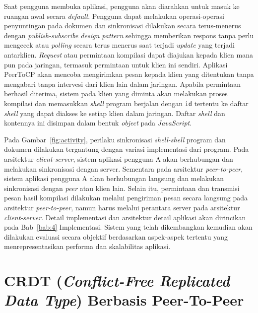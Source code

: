 Saat pengguna membuka aplikasi, pengguna akan diarahkan untuk masuk ke ruangan awal secara \textit{default}. Pengguna dapat melakukan operasi-operasi penyuntingan pada dokumen dan sinkronisasi dilakukan secara terus-menerus dengan \textit{publish-subscribe design pattern} sehingga memberikan respons tanpa perlu mengecek atau \textit{polling} secara terus menerus saat terjadi \textit{update} yang terjadi antarklien. \textit{Request} atau permintaan kompilasi dapat diajukan kepada klien mana pun pada jaringan, termasuk permintaan untuk klien ini sendiri. Aplikasi PeerToCP akan mencoba mengirimkan pesan kepada klien yang ditentukan tanpa mengabari tanpa intervesi dari klien lain dalam jaringan. Apabila permintaan berhasil diterima, sistem pada klien yang diminta akan melakukan proses kompilasi dan memasukkan \textit{shell} program berjalan dengan \texttt{id} tertentu ke daftar \textit{shell} yang dapat diakses ke setiap klien dalam jaringan. Daftar \textit{shell} dan kontennya ini disimpan dalam bentuk \textit{object} pada \textit{JavaScript}.

Pada Gambar~\ref{fig:activity}, perilaku sinkronisasi \textit{shell-shell} program dan dokumen dilakukan tergantung dengan variasi implementasi dari program. Pada arsitektur \textit{client-server}, sistem aplikasi pengguna A akan berhubungan dan melakukan sinkronisasi dengan server. Sementara pada arsitektur \textit{peer-to-peer}, sistem aplikasi pengguna A akan berhubungan langsung dan melakukan sinkronisasi dengan \textit{peer} atau klien lain. Selain itu, permintaan dan transmisi pesan hasil kompilasi dilakukan melalui pengiriman pesan secara langsung pada arsitektur \textit{peer-to-peer}, namun harus melalui perantara server pada arsitektur \textit{client-server}. Detail implementasi dan arsitektur detail aplikasi akan dirincikan pada Bab~\ref{bab:4} Implementasi. Sistem yang telah dikembangkan kemudian akan dilakukan evaluasi secara objektif berdasarkan aspek-aspek tertentu yang menrepresentasikan performa dan skalabilitas aplikasi.

\section{CRDT (\textit{Conflict-Free Replicated Data Type}) Berbasis Peer-To-Peer}

